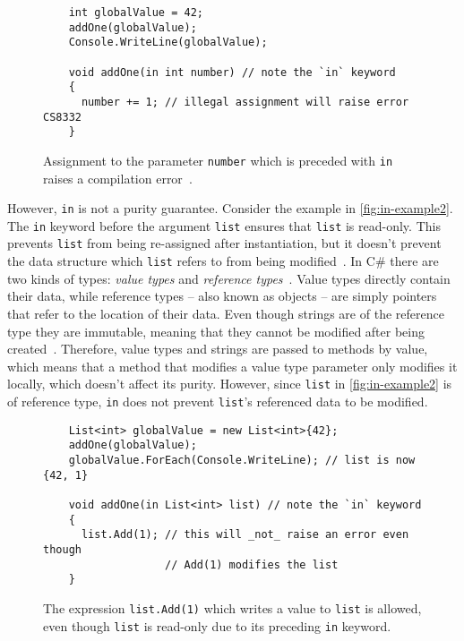 \documentclass[a4paper,12pt]{article}
\begin{document}
\begin{figure}[H]
  \centering
  \begin{lstlisting}
    int globalValue = 42;
    addOne(globalValue);
    Console.WriteLine(globalValue);

    void addOne(in int number) // note the `in` keyword
    {
      number += 1; // illegal assignment will raise error CS8332
    }
  \end{lstlisting}
  \caption{Assignment to the parameter \texttt{number} which is preceded with \texttt{in} raises a compilation error~\cite{microsoft-in-modifier}.}
  \label{fig:in-example1}
\end{figure}

However, \texttt{in} is not a purity guarantee. Consider the example in \autoref{fig:in-example2}. The \texttt{in} keyword before the argument \texttt{list} ensures that \texttt{list} is read-only. This prevents \texttt{list} from being re-assigned after instantiation, but it doesn't prevent the data structure which \texttt{list} refers to from being modified~\cite{buchanan-static-lists}. In C\# there are two kinds of types: \textit{value types} and \textit{reference types}~\cite{microsoft-types}. Value types directly contain their data, while reference types -- also known as objects -- are simply pointers that refer to the location of their data.  Even though strings are of the reference type they are immutable, meaning that they cannot be modified after being created~\cite{microsoft-strings}. Therefore, value types and strings are passed to methods by value, which means that a method that modifies a value type parameter only modifies it locally, which doesn't affect its purity. However, since \texttt{list} in \autoref{fig:in-example2} is of reference type, \texttt{in} does not prevent \texttt{list}'s referenced data to be modified.

\begin{figure}[H]
  \centering
  \begin{lstlisting}
    List<int> globalValue = new List<int>{42};
    addOne(globalValue);
    globalValue.ForEach(Console.WriteLine); // list is now {42, 1}

    void addOne(in List<int> list) // note the `in` keyword
    {
      list.Add(1); // this will _not_ raise an error even though
                   // Add(1) modifies the list
    }
  \end{lstlisting}
  \caption{The expression \texttt{list.Add(1)} which writes a value to \texttt{list} is allowed, even though \texttt{list} is read-only due to its preceding \texttt{in} keyword.}
  \label{fig:in-example2}
\end{figure}
\end{document}
